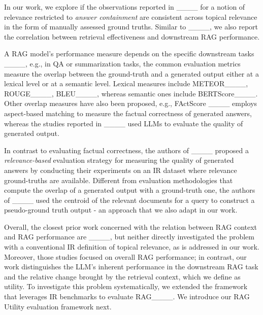  In our work, we explore if the observations reported in ____ for a notion of relevance restricted to \textit{answer containment} are consistent across topical relevance in the form of manually assessed ground truths. Similar to ____, we also report the correlation between retrieval effectiveness and downstream RAG performance.


A RAG model's performance measure depends on the specific downstream tasks ____, e.g., in QA or summarization tasks, the common evaluation metrics measure the overlap between the ground-truth and a generated output either at a lexical level or at a semantic level. Lexical measures include
METEOR____, ROUGE____, BLEU____, whereas semantic ones include BERTScore____. Other overlap measures have also been proposed, e.g., FActScore ____ employs aspect-based matching to measure the factual correctness of generated answers, whereas the studies reported in ____ used LLMs to evaluate the quality of generated output.

In contrast to evaluating factual correctness, the authors of ____ proposed a \textit{relevance-based} evaluation strategy for measuring the quality of generated answers by conducting their experiments on an IR dataset where relevance ground-truths are available. Different from evaluation methodologies that compute the overlap of a generated output with a ground-truth one, the authors of ____ used the centroid of the relevant documents for a query to construct a pseudo-ground truth output - an approach that we also adapt in our work.

  Overall, the closest prior work concerned with the relation between RAG context and RAG performance are ____, but neither directly investigated the problem with a conventional IR definition of topical relevance, as is addressed in our work. Moreover, those studies focused on overall RAG performance; in contrast, our work distinguishes the LLM's inherent performance in the downstream RAG task and the relative change brought by the retrieval context, which we define as utility. To investigate this problem systematically, we extended the framework that leverages IR benchmarks to evaluate RAG____. We introduce our RAG Utility evaluation framework next.